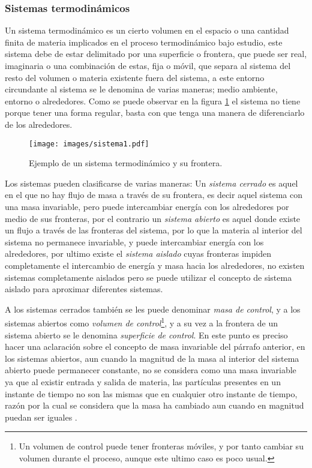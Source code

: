 \documentclass[../master.tex]{subfiles}
\begin{document}
\subsubsection{Sistemas termodinámicos}

Un sistema termodinámico es un cierto volumen en el espacio o una cantidad finita de materia implicados en el proceso termodinámico bajo estudio, este sistema debe de estar delimitado por una superficie o frontera, que puede ser real, imaginaria o una combinación de estas, fija o móvil, que separa al sistema del resto del volumen o materia existente fuera del sistema, a este entorno circundante al sistema se le denomina de varias maneras; medio ambiente, entorno o alrededores. Como se puede observar en la figura \ref{fig:exp_sistema} el sistema no tiene porque tener una forma regular, basta con que tenga una manera de diferenciarlo de los alrededores.

\begin{figure}[htbp]
    \centering
    \texttt{[image: images/sistema1.pdf]}
    \caption{Ejemplo de un sistema termodinámico y su frontera.}
    \label{fig:exp_sistema}
\end{figure}

Los sistemas pueden clasificarse de varias maneras: Un \emph{sistema cerrado} es aquel en el que no hay flujo de masa a través de su frontera, es decir aquel sistema con una masa invariable, pero puede intercambiar energía con los alrededores por medio de sus fronteras, por el contrario un \emph{sistema abierto} es aquel donde existe un flujo a través de las fronteras del sistema, por lo que la materia al interior del sistema no permanece invariable, y puede intercambiar energía con los alrededores, por ultimo existe el \emph{sistema aislado} cuyas fronteras impiden completamente el intercambio de energía y masa hacia los alrededores, no existen sistemas completamente aislados pero se puede utilizar el concepto de sistema aislado para aproximar diferentes sistemas.

A los sistemas cerrados también se les puede denominar \emph{masa de control}, y a los sistemas abiertos como \emph{volumen de control}\footnote{Un volumen de control puede tener fronteras móviles, y por tanto cambiar su volumen durante el proceso, aunque este ultimo caso es poco usual.}, y a su vez a la frontera de un sistema abierto se le denomina \emph{superficie de control}. En este punto es preciso hacer una aclaración sobre el concepto de masa invariable del párrafo anterior, en los sistemas abiertos, aun cuando la magnitud de la masa al interior del sistema abierto puede permanecer constante, no se considera como una masa invariable ya que al existir entrada y salida de materia, las partículas presentes en un instante de tiempo no son las mismas que en cualquier otro instante de tiempo, razón por la cual se considera que la masa ha cambiado aun cuando en magnitud puedan ser iguales \parencites{clavell}{faires}{wark}.
\end{document}
